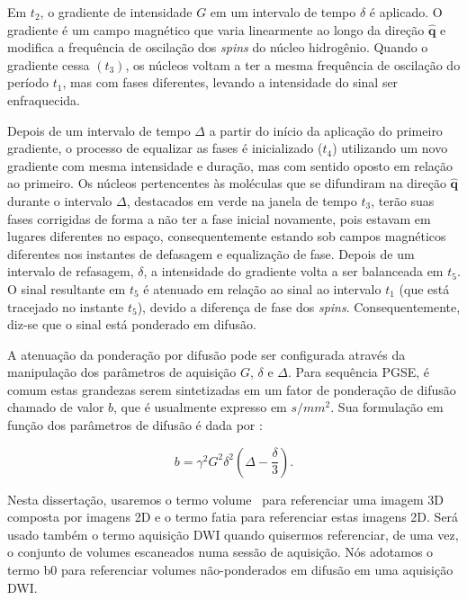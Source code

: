 \documentclass[
    12pt,                %
    oneside,            %
    a4paper,            %
    english,            %
    french,                %
    spanish,            %
    brazil                %
    ]{abntex2}
\begin{document}
Em $t_2$, o gradiente de intensidade $G$ em um intervalo de tempo $\delta$ é aplicado. O gradiente é um campo magnético que varia linearmente ao longo da direção $\mathbf{\hat{q}}$ e modifica a frequência de oscilação dos \textit{spins} do núcleo hidrogênio. Quando o gradiente cessa $(t_3)$, os núcleos voltam a ter a mesma frequência de oscilação do período $t_1$, mas com fases diferentes, levando a intensidade do sinal ser enfraquecida.

Depois de um intervalo de tempo $\Delta$ a partir do início da aplicação do primeiro gradiente, o processo de equalizar as fases é inicializado ($t_4$) utilizando um novo gradiente com mesma intensidade e duração, mas com sentido oposto em relação ao primeiro. Os núcleos pertencentes às moléculas que se difundiram na direção $\mathbf{\hat{q}}$ durante o intervalo $\Delta$, destacados em verde na janela de tempo $t_3$, terão suas fases corrigidas de forma a não ter a fase inicial novamente, pois estavam em lugares diferentes no espaço, consequentemente estando sob campos magnéticos diferentes nos instantes de defasagem e equalização de fase. Depois de um intervalo de refasagem, $\delta$, a intensidade do gradiente volta a ser balanceada em $t_5$.
O sinal resultante em $t_5$ é atenuado em relação ao sinal ao intervalo $t_1$ (que está tracejado no instante $t_5$), devido a diferença de fase dos \textit{spins}. Consequentemente, diz-se que o sinal está ponderado em difusão.


A atenuação da ponderação por difusão pode ser configurada através da manipulação dos parâmetros de aquisição  $G$, $\delta$ e $\Delta$. Para sequência PGSE, é comum estas grandezas serem sintetizadas em um fator de ponderação de difusão chamado de valor $b$, que é usualmente expresso em $s/mm^2$. Sua formulação em função dos parâmetros de difusão é dada por \cite{DTI_Handbook}:

\begin{equation}
\label{eq::bvalue}
    b = \gamma^2G^2\delta^2(\Delta - \frac{\delta}{3}).
\end{equation}

Nesta dissertação, usaremos o termo \textsf{volume} ~para referenciar uma imagem 3D composta por imagens 2D e o termo \textsf{fatia} para referenciar estas imagens 2D. Será usado também o termo \textsf{aquisição DWI} quando quisermos referenciar, de uma vez, o conjunto de volumes escaneados numa sessão de aquisição. Nós adotamos o termo \textsf{b0}  para referenciar volumes não-ponderados em difusão em uma aquisição DWI.
\end{document}
